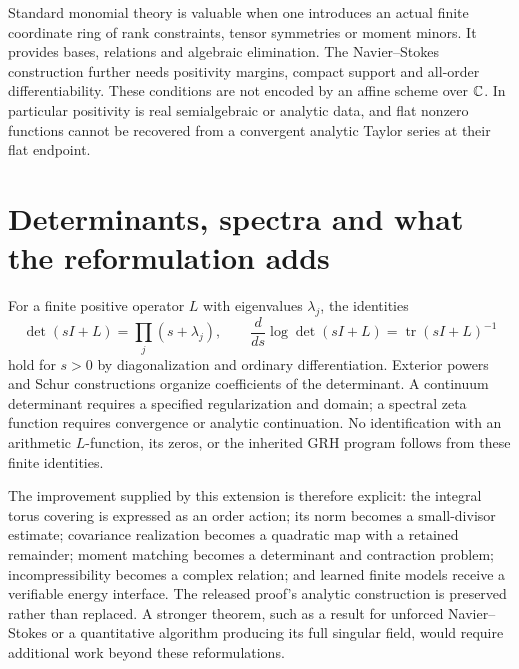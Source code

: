 Standard monomial theory is valuable when one introduces an actual finite coordinate ring of rank constraints, tensor symmetries or moment minors. It provides bases, relations and algebraic elimination. The Navier--Stokes construction further needs positivity margins, compact support and all-order differentiability. These conditions are not encoded by an affine scheme over $\mathbb{C}$. In particular positivity is real semialgebraic or analytic data, and flat nonzero functions cannot be recovered from a convergent analytic Taylor series at their flat endpoint.

\section{Determinants, spectra and what the reformulation adds}

For a finite positive operator $L$ with eigenvalues $\lambda_j$, the identities
\[
 \det(sI+L)=\prod_j(s+\lambda_j),\qquad
 \frac d{ds}\log\det(sI+L)=\operatorname{tr}(sI+L)^{-1}
\]
hold for $s>0$ by diagonalization and ordinary differentiation. Exterior powers and Schur constructions organize coefficients of the determinant. A continuum determinant requires a specified regularization and domain; a spectral zeta function requires convergence or analytic continuation. No identification with an arithmetic $L$-function, its zeros, or the inherited GRH program follows from these finite identities.

The improvement supplied by this extension is therefore explicit: the integral torus covering is expressed as an order action; its norm becomes a small-divisor estimate; covariance realization becomes a quadratic map with a retained remainder; moment matching becomes a determinant and contraction problem; incompressibility becomes a complex relation; and learned finite models receive a verifiable energy interface. The released proof's analytic construction is preserved rather than replaced. A stronger theorem, such as a result for unforced Navier--Stokes or a quantitative algorithm producing its full singular field, would require additional work beyond these reformulations.
